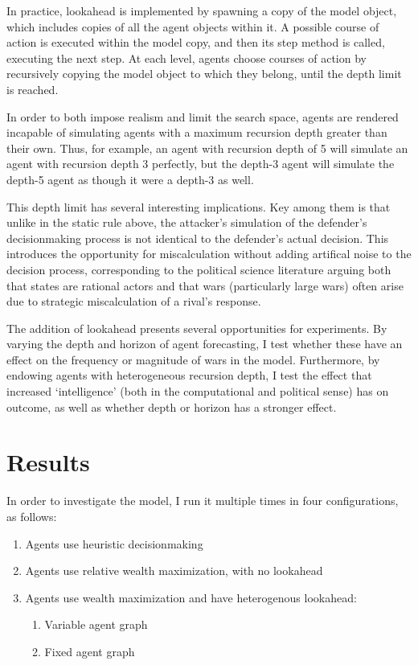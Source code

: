 \documentclass{article}
\begin{document}
In practice, lookahead is implemented by spawning a copy of the model object, which includes copies of all the agent objects within it. A possible course of action is executed within the model copy, and then its step method is called, executing the next step. At each level, agents choose courses of action by recursively copying the model object to which they belong, until the depth limit is reached. 

In order to both impose realism and limit the search space, agents are rendered incapable of simulating agents with a maximum recursion depth greater than their own. Thus, for example, an agent with recursion depth of 5 will simulate an agent with recursion depth 3 perfectly, but the depth-3 agent will simulate the depth-5 agent as though it were a depth-3 as well.

This depth limit has several interesting implications. Key among them is that unlike in the static rule above, the attacker's simulation of the defender's decisionmaking process is not identical to the defender's actual decision. This introduces the opportunity for miscalculation without adding artifical noise to the decision process, corresponding to the political science literature arguing both that states are rational actors and that wars (particularly large wars) often arise due to strategic miscalculation of a rival's response. 

The addition of lookahead presents several opportunities for experiments. By varying the depth and horizon of agent forecasting, I test whether these have an effect on the frequency or magnitude of wars in the model. Furthermore, by endowing agents with heterogeneous recursion depth, I test the effect that increased `intelligence' (both in the computational and political sense) has on outcome, as well as whether depth or horizon has a stronger effect. 

\section{Results}

In order to investigate the model, I run it multiple times in four configurations, as follows:
\begin{enumerate}
	\item Agents use heuristic decisionmaking
	\item Agents use relative wealth maximization, with no lookahead
	\item Agents use wealth maximization and have heterogenous lookahead: 
	\begin{enumerate}
		\item Variable agent graph
		\item Fixed agent graph
	\end{enumerate}
\end{enumerate}
\end{document}
